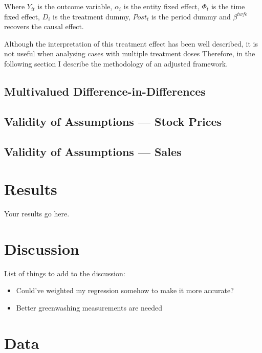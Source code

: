 \documentclass[12pt]{article}
\begin{document}
Where $Y_{it}$ is the outcome variable, $\alpha_i$ is the entity fixed effect, $\Phi_t$ is the time fixed effect, $D_i$ is the treatment dummy, $Post_t$ is the period dummy and $\beta^{twfe}$ recovers the causal effect. 

Although the interpretation of this treatment effect has been well described, it is not useful when analysing cases with multiple treatment doses \parencite{callawayDifferenceindifferencesContinuousTreatment2024} Therefore, in the following section I describe the methodology of an adjusted framework.

\subsection{Multivalued Difference-in-Differences}

\subsection{Validity of Assumptions --- Stock Prices}

\subsection{Validity of Assumptions --- Sales}


\newpage

\section{Results}\label{sect:results}
Your results go here.



\section{Discussion}\label{sect:discussion}

List of things to add to the discussion:
\begin{itemize}
    \item Could've weighted my regression somehow to make it more accurate?
    \item Better greenwashing measurements are needed

\end{itemize}

\pagebreak
\printbibliography{}
\pagebreak
\appendix

\section{Data}\label{app:data}
\end{document}
